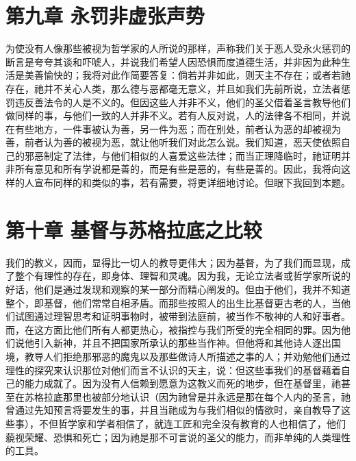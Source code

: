 \section{第九章 永罚非虚张声势}

为使没有人像那些被视为哲学家的人所说的那样，声称我们关于恶人受永火惩罚的断言是夸夸其谈和吓唬人，并说我们希望人因恐惧而度道德生活，并非因为此种生活是美善愉快的；我将对此作简要答复：倘若并非如此，则天主不存在；或者若祂存在，祂并不关心人类，那么德与恶都毫无意义，并且如我们先前所说，立法者惩罚违反善法令的人是不义的。但因这些人并非不义，他们的圣父借着圣言教导他们做同样的事，与他们一致的人并非不义。若有人反对说，人的法律各不相同，并说在有些地方，一件事被认为善，另一件为恶；而在别处，前者认为恶的却被视为善，前者认为善的被视为恶，就让他听我们对此怎么说。我们知道，恶天使依照自己的邪恶制定了法律，与他们相似的人喜爱这些法律；而当正理降临时，祂证明并非所有意见和所有学说都是善的，而是有些是恶的，有些是善的。因此，我将向这样的人宣布同样的和类似的事，若有需要，将更详细地讨论。但眼下我回到本题。\par


\section{第十章 基督与苏格拉底之比较}

我们的教义，因而，显得比一切人的教导更伟大；因为基督，为了我们而显现，成了整个有理性的存在，即身体、理智和灵魂。因为我，无论立法者或哲学家所说的好话，他们是通过发现和观察的某一部分而精心阐发的。但由于他们，我并不知道整个，即基督，他们常常自相矛盾。而那些按照人的出生比基督更古老的人，当他们试图通过理智思考和证明事物时，被带到法庭前，被当作不敬神的人和好事者。而，在这方面比他们所有人都更热心，被指控与我们所受的完全相同的罪。因为他们说他引入新神，并且不把国家所承认的那些当作神。但他将和其他诗人逐出国境，教导人们拒绝那邪恶的魔鬼以及那些做诗人所描述之事的人；并劝勉他们通过理性的探究来认识那位对他们而言不认识的天主，说：但这些事我们的基督藉着自己的能力成就了。因为没有人信赖到愿意为这教义而死的地步，但在基督里，祂甚至在苏格拉底那里也被部分地认识（因为祂曾是并永远是那在每个人内的圣言，祂曾通过先知预言将要发生的事，并且当祂成为与我们相似的情欲时，亲自教导了这些事），不但哲学家和学者相信了，就连工匠和完全没有教育的人也相信了，他们藐视荣耀、恐惧和死亡；因为祂是那不可言说的圣父的能力，而非单纯的人类理性的工具。\par

